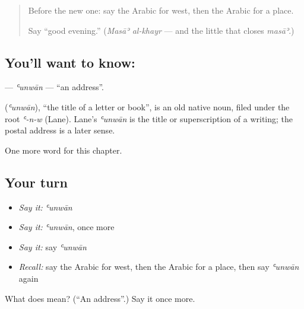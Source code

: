 \label{lesson:AR-C104-unwan}



\begin{quote}
Before the new one: say the Arabic for west, then the Arabic for a place.

Say \textquotedblleft{}good evening.\textquotedblright{} (\emph{Masāʾ al-khayr} — and the little \textbf{} that closes \emph{masāʾ}.)
\end{quote}

\subsection*{You'll want to know: }
\textbf{} — \emph{ʿunwān} — \textquotedblleft{}an address\textquotedblright{}.

\begin{cousinweb}
\textbf{} (\emph{ʿunwān}), \textquotedblleft{}the title of a letter or book\textquotedblright{}, is an old native noun, filed under the root \emph{ʿ-n-w} (Lane). Lane's \emph{ʿunwān} is the title or superscription of a writing; the postal address is a later sense.
\end{cousinweb}

\begin{grammarlens}[title={What you've built}]
One more word for this chapter.
\end{grammarlens}

\subsection*{Your turn}
\begin{itemize}
\raggedright
  \item \emph{Say it:} \emph{ʿunwān}
  \item \emph{Say it:} \emph{ʿunwān}, once more
  \item \emph{Say it:} say \emph{ʿunwān}
  \item \emph{Recall:} say the Arabic for west, then the Arabic for a place, then say \emph{ʿunwān} again
\end{itemize}

\begin{tcolorbox}[breakable,colback=teal!4,colframe=teal!35!black,title={Before you move on}]
What does  mean? (\textquotedblleft{}An address\textquotedblright{}.) Say it once more.
\end{tcolorbox}
